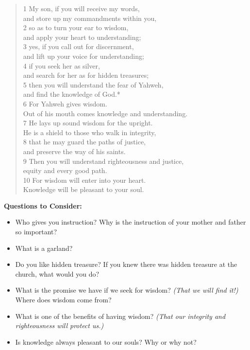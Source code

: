 \documentclass[
]{book}
\providecommand{\tightlist}{%
  \setlength{\itemsep}{0pt}\setlength{\parskip}{0pt}}
\begin{document}
\begin{quote}
1 My son, if you will receive my words,\\
and store up my commandments within you,\\
2 so as to turn your ear to wisdom,\\
and apply your heart to understanding;\\
3 yes, if you call out for discernment,\\
and lift up your voice for understanding;\\
4 if you seek her as silver,\\
and search for her as for hidden treasures;\\
5 then you will understand the fear of Yahweh,\\
and find the knowledge of God.*\\
6 For Yahweh gives wisdom.\\
Out of his mouth comes knowledge and understanding.\\
7 He lays up sound wisdom for the upright.\\
He is a shield to those who walk in integrity,\\
8 that he may guard the paths of justice,\\
and preserve the way of his saints.\\
9 Then you will understand righteousness and justice,\\
equity and every good path.\\
10 For wisdom will enter into your heart.\\
Knowledge will be pleasant to your soul.
\end{quote}

\textbf{Questions to Consider:}

\begin{itemize}
\tightlist
\item
  Who gives you instruction? Why is the instruction of your mother and father so important?
\item
  What is a garland?
\item
  Do you like hidden treasure? If you knew there was hidden treasure at the church, what would you do?
\item
  What is the promise we have if we seek for wisdom? \emph{(That we will find it!)} Where does wisdom come from?
\item
  What is one of the benefits of having wisdom? \emph{(That our integrity and righteousness will protect us.)}
\item
  Is knowledge always pleasant to our souls? Why or why not?
\end{itemize}
\end{document}
